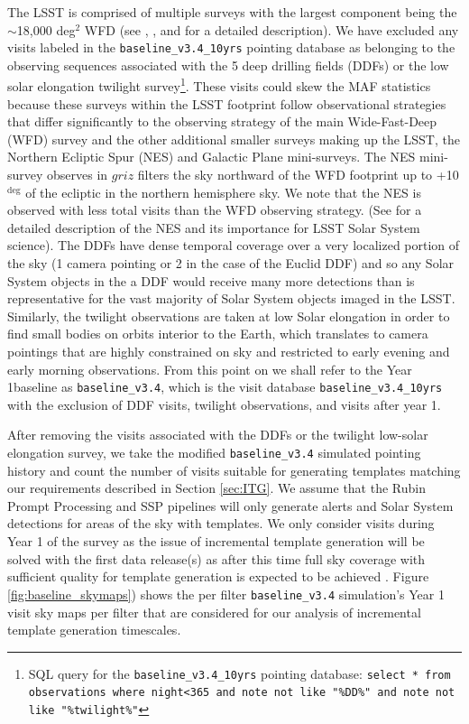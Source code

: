 \documentclass[preprint,linenumbers]{aastex631}
\newcommand{\baseline}{\texttt{baseline\_v3.4}\xspace}
\newcommand{\baselinefull}{\texttt{baseline\_v3.4\_10yrs}\xspace}
\begin{document}
	The LSST is comprised of multiple surveys with the largest component being the $\sim$18,000 deg$^2$ WFD (see \cite{SCOC_Report_1} , \cite{2022ApJS..258....1B}, and \cite{SCOC_Report_2} for a detailed description). 
	We have excluded any visits labeled in the \baselinefull pointing database as belonging to the observing sequences associated with the 5 deep drilling fields (DDFs)  or the low solar elongation twilight survey\footnote{SQL query for the \baselinefull pointing database: \texttt{select * from observations where night<365 and note not like "\%DD\%" and note not like "\%twilight\%"}}.
	These visits could skew the MAF statistics because these surveys within the LSST footprint follow  observational strategies that differ significantly to the observing strategy of the main Wide-Fast-Deep (WFD) survey and the other additional smaller surveys making up the LSST, the Northern Ecliptic Spur (NES) and Galactic Plane mini-surveys. The NES mini-survey observes in $griz$ filters the sky northward of the WFD footprint up to +10$^{\deg}$ of the ecliptic in the northern hemisphere sky. We note that the NES is observed with less total visits than the WFD observing strategy. (See \cite{schwambTuningLegacySurvey2023} for a detailed description of the NES and its importance for LSST Solar System science). 
	The DDFs have dense temporal coverage over a very localized portion of the sky (1 camera pointing or 2 in the case of the Euclid DDF) and so any Solar System objects in the a DDF would receive many more detections than is representative for the vast majority of Solar System objects imaged in the LSST. Similarly, the twilight observations are taken at low Solar elongation in order to find small bodies on orbits interior to the Earth, which translates to camera pointings that are highly constrained on sky and restricted to early evening and early morning observations. 
	From this point on we shall refer to the Year 1baseline as \baseline, which is the visit database \baselinefull with the exclusion of DDF visits, twilight observations, and visits after year 1.
	
	After removing the visits associated with the DDFs or the twilight low-solar elongation survey, we take the modified  \baseline  simulated pointing history and count the number of visits suitable for generating templates matching our requirements described in Section \ref{sec:ITG}. We assume that the Rubin Prompt Processing and SSP pipelines will only generate alerts and Solar System detections for areas of the sky with templates. We  only consider visits during Year 1 of the survey as the issue of incremental template generation will be solved with the first data release(s) as after this time full sky coverage with sufficient quality for template generation is expected to be achieved \citep{RTN-011}. Figure \ref{fig:baseline_skymaps}) shows the per filter \baseline simulation's Year 1 visit sky maps per filter that are considered for our analysis of incremental template generation timescales. 
	
\end{document}
